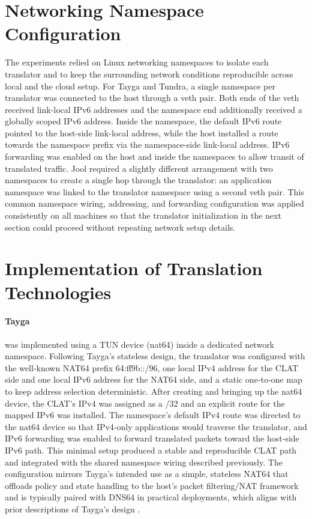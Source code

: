 \section{Networking Namespace Configuration}
The experiments relied on Linux networking namespaces to isolate each translator and to keep the surrounding network conditions reproducible across local and the cloud setup. For Tayga and Tundra, a single namespace per translator was connected to the host through a veth pair\cite{veth4}. Both ends of the veth received link-local IPv6 addresses and the namespace end additionally received a globally scoped IPv6 address. Inside the namespace, the default IPv6 route pointed to the host-side link-local address, while the host installed a route towards the namespace prefix via the namespace-side link-local address. IPv6 forwarding was enabled on the host and inside the namespaces to allow transit of translated traffic. 
Jool required a slightly different arrangement with two namespaces to create a single hop through the translator: an application namespace was linked to the translator namespace using a second veth pair. This common namespace wiring, addressing, and forwarding configuration was applied consistently on all machines so that the translator initialization in the next section could proceed without repeating network setup details.




\section{Implementation of Translation Technologies}
\paragraph{Tayga}
was implemented using a TUN device (nat64) inside a dedicated network namespace. Following Tayga’s stateless design, the translator was configured with the well‑known NAT64 prefix 64:ff9b::/96, one local IPv4 address for the CLAT side and one local IPv6 address for the NAT64 side, and a static one‑to‑one map to keep address selection deterministic. After creating and bringing up the nat64 device, the CLAT’s IPv4 was assigned as a /32 and an explicit route for the mapped IPv6 was installed. The namespace’s default IPv4 route was directed to the nat64 device so that IPv4‑only applications would traverse the translator, and IPv6 forwarding was enabled to forward translated packets toward the host‑side IPv6 path. This minimal setup produced a stable and reproducible CLAT path and integrated with the shared namespace wiring described previously. The configuration mirrors Tayga’s intended use as a simple, stateless NAT64 that offloads policy and state handling to the host’s packet filtering/NAT framework and is typically paired with DNS64 in practical deployments, which aligns with prior descriptions of Tayga’s design \cite{Repas_Farnadi_Lencse_2014,palrd_tayga_readme}.

